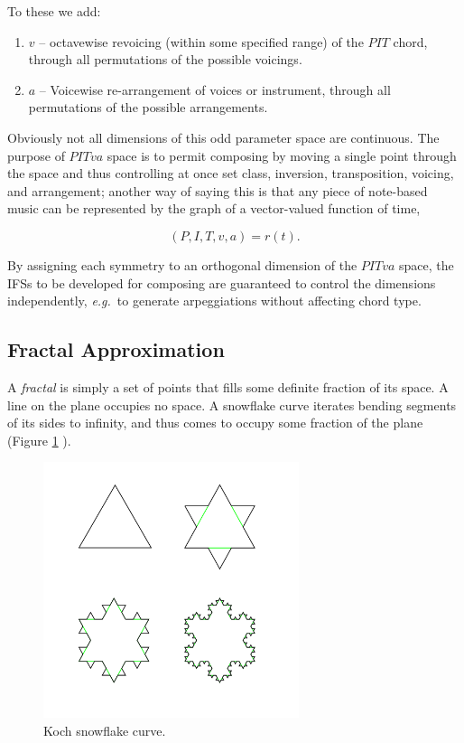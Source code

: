 \documentclass[english,11pt,letterpaper,onecolumn]{scrartcl}
\numberwithin{equation}{section}
\begin{document}
\noindent To these we add:

\begin{enumerate}[resume]
\item $v$ -- octavewise revoicing (within some specified range) of the $PIT$
chord, through all permutations of the possible voicings.
\item $a$ -- Voicewise re-arrangement of voices or instrument, through all
permutations of the possible arrangements.
\end{enumerate}

\noindent Obviously not all dimensions of this odd parameter space are
continuous. The purpose of $PITva$ space is to permit composing by moving a
single point through the space and thus controlling at once set class,
inversion, transposition, voicing, and arrangement; another way of saying this
is that any piece of note-based music can be represented by the graph of a
vector-valued function of time,

$$(P, I, T, v, a) = r(t).$$

By assigning each symmetry to an orthogonal dimension of the $PITva$ space, the
IFSs to be developed for composing are guaranteed to control the dimensions
independently, \textit{e.g.}\ to generate arpeggiations without affecting
chord type.

\subsection{Fractal Approximation}

A \textit{fractal} is simply a set of points that fills some definite fraction
of its space. A line on the plane occupies no space. A snowflake curve
iterates bending segments of its sides to infinity, and thus comes to occupy
some fraction of the plane (Figure \ref{fig:kochflake}
\cite{Mandelbrot:1982:FGN}).

\begin{figure}
\centerline{\includegraphics[width = 0.6667\textwidth]{KochFlake}}
\caption{\label{fig:kochflake} Koch snowflake
curve.\protect\footnotemark}
\end{figure}
\end{document}
